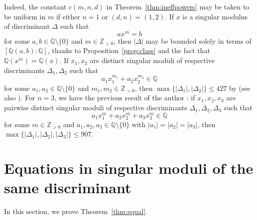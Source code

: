 \documentclass[11pt,a4paper, british]{amsart}
\theoremstyle{definition}
\theoremstyle{remark}
\numberwithin{equation}{section}
\newcommand{\alg}{\overline{\mathbb{Q}}} %
\newcommand{\Q}{\mathbb{Q}} %
\newcommand{\Z}{\mathbb{Z}} %
\begin{document}
	
	Indeed, the constant $c(m, n, d)$ in Theorem~\ref{thm:ineffpowers} may be taken to be uniform in $m$ if either $n = 1$ or $(d, n) = (1, 2)$. If $x$ is a singular modulus of discriminant $\Delta$ such that
	\[a x^m = b\]
	for some $a, b \in \alg \setminus \{0\}$ and $m \in \Z_{>0}$, then $\lvert \Delta \rvert$ may be bounded solely in terms of $[\Q(a, b) : \Q]$, thanks to Proposition~\ref{prop:class} and the fact \cite[Lemma~2.6]{Riffaut19} that $\Q(x^m) = \Q(x)$. If $x_1, x_2$ are distinct singular moduli of respective discriminants $\Delta_1, \Delta_2$ such that
	\[ a_1 x_1^{m_1} + a_2 x_2^{m_2} \in \Q\]
	for some $a_1, a_2 \in \Q \setminus \{0\}$ and $m_1, m_2 \in \Z_{>0}$, then $\max \{\lvert \Delta_1 \rvert, \lvert \Delta_2 \rvert \} \leq 427$
	by \cite[Theorem~1.3]{LucaRiffaut19} (see also \cite[Theorem~1.5]{Riffaut19}). For $n = 3$, we have the previous result of the author \cite[Theorem~1.1]{Fowler23}: if $x_1, x_2, x_3$ are pairwise distinct singular moduli of respective discriminants $\Delta_1, \Delta_2, \Delta_3$ such that
	\[ a_1 x_1^m + a_2 x_2^m + a_3 x_3^m \in \Q\]
	for some $m \in \Z_{>0}$ and $a_1, a_2, a_3 \in \Q \setminus \{0\}$ with $\lvert a_1 \rvert = \lvert a_2 \rvert = \lvert a_3 \rvert$, then $\max \{\lvert \Delta_1 \rvert, \lvert \Delta_2 \rvert, \lvert \Delta_3 \rvert \} \leq 907$.




\section{Equations in singular moduli of the same discriminant}\label{sec:same}


	
In this section, we prove Theorem~\ref{thm:equal}.
	
\end{document}
